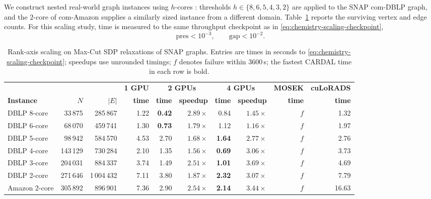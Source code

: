 \documentclass[11pt]{article}
\theoremstyle{definition}
\theoremstyle{remark}
\newcommand{\name}{\textsc{CARDAL}\xspace}
\begin{document}
We construct nested real-world graph instances using $h$-cores
\cite{Seidman1983kcores}: thresholds $h\in\{8,6,5,4,3,2\}$ are applied to
the SNAP \textsf{com-DBLP} graph, and the $2$-core of
\textsf{com-Amazon} supplies a similarly sized instance from a different
domain.  Table~\ref{tab:rankwise} reports the surviving vertex and edge
counts.  For this scaling study, time is measured to the same throughput
checkpoint as in
\eqref{eq:chemistry-scaling-checkpoint},
\[
  \mathrm{pres}<10^{-3},
  \qquad
  \mathrm{gap}<10^{-2}.
\]
\begin{table}[H]
\centering
\caption{Rank-axis scaling on Max-Cut SDP relaxations of SNAP graphs.  Entries
are times in seconds to \eqref{eq:chemistry-scaling-checkpoint}; speedups use
unrounded timings; $f$ denotes failure within $3600$\,s; the fastest \name{}
time in each row is bold.}
\label{tab:rankwise}
{\setlength{\tabcolsep}{4pt}
\begin{tabular}{lrrrrrrrrr}
\toprule
& & &
  \textbf{1 GPU} & \multicolumn{2}{c}{\textbf{2 GPUs}}
  & \multicolumn{2}{c}{\textbf{4 GPUs}}
  & \textbf{MOSEK} & \textbf{cuLoRADS}\\
\cmidrule(lr){4-4}\cmidrule(lr){5-6}\cmidrule(lr){7-8}
\cmidrule(lr){9-9}\cmidrule(lr){10-10}
\textbf{Instance} & \textbf{$N$} & \textbf{$|E|$}
& \textbf{time} & \textbf{time} & \textbf{speedup}
& \textbf{time} & \textbf{speedup} & \textbf{time} & \textbf{time}\\
\midrule
DBLP 8-core   & 33\,875  & 285\,867    & 1.22 & \textbf{0.42} & $2.89\times$ & 0.84 & $1.45\times$ & $f$ & 1.32\\
DBLP 6-core   & 68\,070  & 459\,741    & 1.30 & \textbf{0.73} & $1.79\times$ & 1.12 & $1.16\times$ & $f$ & 1.97\\
DBLP 5-core   & 98\,942  & 584\,570    & 4.53 & 2.70 & $1.68\times$ & \textbf{1.64} & $2.77\times$ & $f$ & 2.76\\
DBLP 4-core   & 143\,129 & 730\,284    & 2.10 & 1.35 & $1.56\times$ & \textbf{0.69} & $3.06\times$ & $f$ & 3.73\\
DBLP 3-core   & 204\,031 & 884\,337    & 3.74 & 1.49 & $2.51\times$ & \textbf{1.01} & $3.69\times$ & $f$ & 4.69\\
DBLP 2-core   & 271\,646 & 1\,004\,432 & 7.11 & 3.80 & $1.87\times$ & \textbf{2.32} & $3.07\times$ & $f$ & 7.79\\
Amazon 2-core & 305\,892 & 896\,901    & 7.36 & 2.90 & $2.54\times$ & \textbf{2.14} & $3.44\times$ & $f$ & 16.63\\
\bottomrule
\end{tabular}
}
\end{table}
\end{document}
